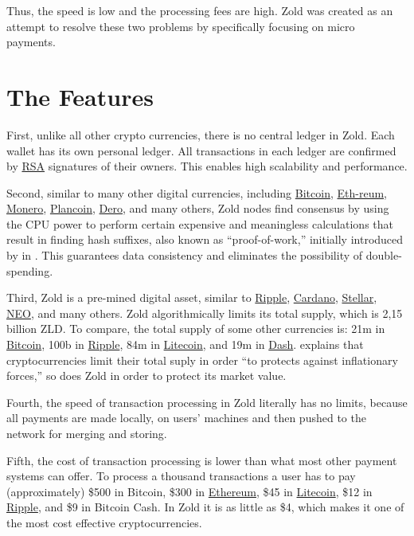 \documentclass{main}
\begin{document}
Thus, the speed is low and the processing fees are high.
Zold was created as an attempt to resolve these two problems
by specifically focusing on micro payments.

\pagebreak

\section*{The Features}

First, unlike all other crypto currencies, there is no central ledger in Zold.
Each wallet has its own personal ledger.
All transactions in each ledger are confirmed by
\href{https://en.wikipedia.org/wiki/RSA_(cryptosystem)}{RSA} signatures of their owners.
This enables high scalability and performance.

Second, similar to many other digital currencies, including
\href{https://bitcoin.org/}{Bit\-coin},
\href{https://ethereum.org/}{Eth-reum},
\href{https://getmonero.org/}{Mone\-ro},
\href{https://plancoin.co/}{Plancoin},
\href{https://dero.io/}{Dero},
and many others, Zold nodes find consensus by using the CPU power to perform certain expensive and meaningless calculations
that result in finding hash suffixes, also known as ``proof-of-work,''
initially introduced by  in \citeyear{back1997}.
This guarantees data consistency and eliminates the possibility of double-spending.

Third, Zold is a pre-mined digital asset, similar to
\href{https://ripple.com/}{Ripple},
\href{https://www.cardano.org/en/home/}{Cardano},
\href{https://www.stellar.org/}{Stellar},
\href{https://neo.org/}{NEO}, and many others.
Zold algorithmically limits its total supply, which is 2,15 billion ZLD.
To compare, the total supply of some other currencies is:
21m in \href{https://bitcoin.org/}{Bitcoin},
100b in \href{https://ripple.com/}{Ripple},
84m in \href{https://litecoin.org/}{Litecoin},
and
19m in \href{https://www.dash.org/}{Dash}.
 explains that cryptocurrencies limit their
total suply in order ``to protects against inflationary forces,''
so does Zold in order to protect its market value.

Fourth, the speed of transaction processing in Zold
literally has no limits, because all payments are made locally, on users'
machines and then pushed to the network for merging and storing.

Fifth, the cost of transaction processing
is lower than what most other payment systems can offer. To process
a thousand transactions a user has to pay (approximately) \$500 in Bitcoin, \$300 in \href{https://ethereum.org/}{Ethereum},
\$45 in \href{https://litecoin.org/}{Litecoin}, \$12 in \href{https://ripple.com/}{Ripple}, and \$9 in Bitcoin Cash.
In Zold it is as little as \$4, which makes it one of the most cost effective
cryptocurrencies.
\end{document}
